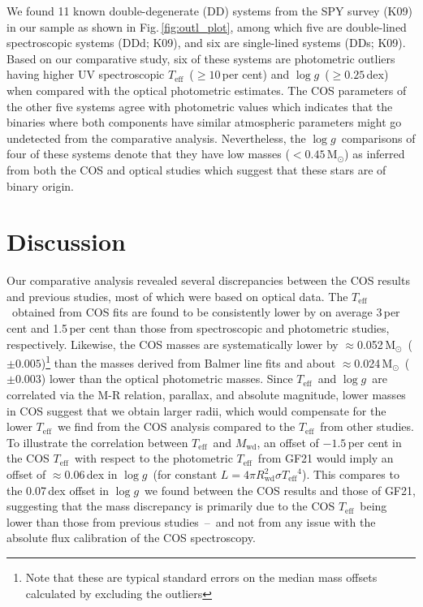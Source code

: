 \documentclass[fleqn,usenatbib, useAMS]{mnras}
\newcommand{\Teff}{\mbox{$T_{\mathrm{eff}}$}}
\newcommand{\logg}{\mbox{$\log g$}}
\newcommand{\Msun}{\mbox{$\mathrm{M_\odot}$}}
\begin{document}
We found 11 known double-degenerate (DD) systems from the SPY survey (K09) in our sample as shown in Fig.\,\ref{fig:outl_plot}, among which five are double-lined spectroscopic systems (DDd; K09), and six are single-lined systems (DDs; K09). Based on our comparative study, six of these systems are photometric outliers having higher UV spectroscopic \Teff\ ($\geq10$\,per cent) and \logg\ ($\geq0.25$\,dex) when compared with the optical photometric estimates. The COS parameters of the other five systems agree with photometric values which indicates that the binaries where both components have similar atmospheric parameters might go undetected from the comparative analysis. Nevertheless, the \logg\ comparisons of four of these systems denote that they have low masses ($<0.45\,\Msun$) as inferred from both the COS and optical studies which suggest that these stars are of binary origin.

\section{Discussion}\label{sec:discus}
Our comparative analysis revealed several discrepancies between the COS results and previous studies, most of which were based on optical data. The \Teff\ obtained from COS fits are found to be consistently lower by on average 3\,per cent and 1.5\,per cent than those from spectroscopic and photometric studies, respectively. Likewise, the COS masses are systematically lower by $\approx$0.052\,\Msun\ ($\pm0.005$)\footnote{Note that these are typical standard errors on the median mass offsets calculated by excluding the outliers} than the masses derived from Balmer line fits and about $\approx$0.024\,\Msun\ ($\pm0.003$) lower than the optical photometric masses. Since \Teff\ and \logg\ are correlated via the M-R relation, parallax, and absolute magnitude, lower masses in COS suggest that we obtain larger radii, which would compensate for the lower \Teff\ we find from the COS analysis compared to the \Teff\ from other studies. To illustrate the correlation between \Teff\ and $M_\mathrm{wd}$, an offset of $-1.5$\,per cent in the COS \Teff\ with respect to the photometric \Teff\ from GF21 would imply an offset of $\approx$0.06\,dex in \logg\ (for constant $L=4\pi R_\mathrm{wd}^{2}\sigma {\Teff}^{4}$). This compares to the 0.07\,dex offset in \logg\ we found between the COS results and those of GF21, suggesting that the mass discrepancy is primarily due to the COS \Teff\ being lower than those from previous studies~--~and not from any issue with the absolute flux calibration of the COS spectroscopy. 
\end{document}
